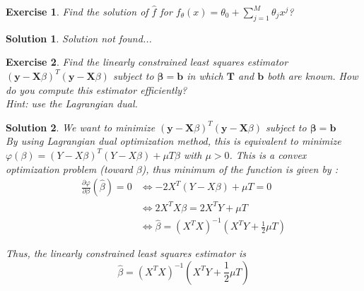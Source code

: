 \documentclass[12pt,a4paper]{article}
\newtheorem{exercise}{Exercise}
\newtheorem{solution}{Solution}
\begin{document}
\begin{exercise}
Find the solution of $\hat f$ for $f_\theta(x)=\theta_0+\sum_{j=1}^M \theta_j x^j$?
\end{exercise}
\begin{solution}
Solution not found...
\end{solution}

\begin{exercise}
Find the linearly constrained least squares estimator $(\mathbf y - \mathbf X \beta)^T(\mathbf y-\mathbf X \beta)$ subject to 
$\mathbf \beta=\mathbf b$ in which $\mathbf T$ and $\mathbf b$ both are known. How do you compute this estimator efficiently? \\
Hint: use the Lagrangian dual.
\end{exercise}
\begin{solution}
We want to minimize $(\mathbf y - \mathbf X \beta)^T(\mathbf y-\mathbf X \beta)$ subject to $\mathbf \beta=\mathbf b$ \\
By using Lagrangian dual optimization method, this is equivalent to minimize $\varphi(\beta) = (Y-X\beta)^T(Y-X\beta) + \mu T \beta$ with $\mu > 0$. This is a convex optimization problem (toward $\beta$), thus minimum of the function is given by :
\begin{equation} 
\begin{split}
\frac{\partial \varphi}{\partial \beta}(\hat \beta) = 0 & \Longleftrightarrow -2X^T(Y-X\beta) + \mu T = 0\\
& \Longleftrightarrow 2X^T X \beta = 2X^T Y + \mu T\\
& \Longleftrightarrow \hat \beta = (X^T X)^{-1}(X^TY + \frac{1}{2} \mu T)
 \end{split}
\end{equation}

Thus, the linearly constrained least squares estimator is $$\boxed{\hat \beta = (X^T X)^{-1}(X^TY + \frac{1}{2} \mu T)}$$
\end{solution}
\end{document}
